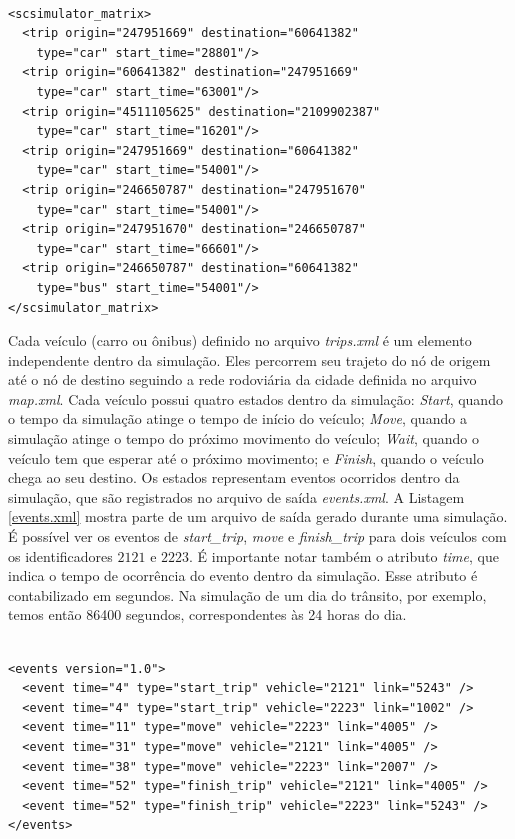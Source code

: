 {\begin{lstlisting}[style=myxml, caption={Exemplo de arquivo trips.xml que define a rede rodoviária da cidade. Fonte: \citet{mabs2017}}, label=trips.xml]

<scsimulator_matrix>
  <trip origin="247951669" destination="60641382"
    type="car" start_time="28801"/>
  <trip origin="60641382" destination="247951669"
    type="car" start_time="63001"/>
  <trip origin="4511105625" destination="2109902387"
    type="car" start_time="16201"/>
  <trip origin="247951669" destination="60641382"
    type="car" start_time="54001"/>
  <trip origin="246650787" destination="247951670"
    type="car" start_time="54001"/>
  <trip origin="247951670" destination="246650787"
    type="car" start_time="66601"/>
  <trip origin="246650787" destination="60641382"
    type="bus" start_time="54001"/>
</scsimulator_matrix>
\end{lstlisting}

  Cada veículo (carro ou ônibus) definido no arquivo \emph{trips.xml} é um
elemento independente dentro da simulação. Eles percorrem seu trajeto do nó de
origem até o nó de destino seguindo a rede rodoviária da cidade definida no
arquivo \emph{map.xml}.  Cada veículo possui quatro estados dentro da
simulação: \emph{Start}, quando o tempo da simulação atinge o tempo de início
do veículo; \emph{Move}, quando a simulação atinge o tempo do próximo movimento
do veículo; \emph{Wait}, quando o veículo tem que esperar até o próximo
movimento; e \emph{Finish}, quando o veículo chega ao seu destino. Os estados
representam eventos ocorridos dentro da simulação, que são registrados no
arquivo de saída \emph{events.xml}. A Listagem \ref{events.xml} mostra parte de
um arquivo de saída gerado durante uma simulação. É possível ver os eventos de
\emph{start\_trip}, \emph{move} e \emph{finish\_trip} para dois veículos com os
identificadores $2121$ e $2223$.  É importante notar também o atributo
\emph{time}, que indica o tempo de ocorrência do evento dentro da simulação.
Esse atributo  é contabilizado em segundos. Na simulação de um dia do trânsito,
por exemplo, temos então 86400 segundos, correspondentes às 24 horas do dia.

\begin{lstlisting}[style=myxml, caption={Exemplo de arquivo de saída events.xml com os eventos da simulação. Fonte: \citet{mabs2017}}, label=events.xml]

<events version="1.0">
  <event time="4" type="start_trip" vehicle="2121" link="5243" />
  <event time="4" type="start_trip" vehicle="2223" link="1002" />
  <event time="11" type="move" vehicle="2223" link="4005" />
  <event time="31" type="move" vehicle="2121" link="4005" />
  <event time="38" type="move" vehicle="2223" link="2007" />
  <event time="52" type="finish_trip" vehicle="2121" link="4005" />
  <event time="52" type="finish_trip" vehicle="2223" link="5243" />
</events>
\end{lstlisting}

}
